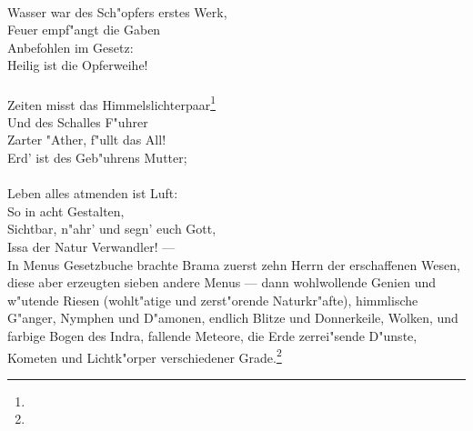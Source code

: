 \documentclass[a4paper, 11pt, oneside, polutonikogreek, german]{article}
\begin{document}
\\
Wasser war des Sch"opfers erstes Werk,\\
Feuer empf"angt die Gaben\\
Anbefohlen im Gesetz:\\
Heilig ist die Opferweihe!\\
\\
\hspace*{1cm} Zeiten misst das Himmelslichterpaar\footnote{}\\
\hspace*{1cm} Und des Schalles F"uhrer\\
\hspace*{1cm} Zarter "Ather, f"ullt das All!\\
\hspace*{1cm} Erd' ist des Geb"uhrens Mutter;\\
\\
\hspace*{2cm} Leben alles atmenden ist Luft:\\
\hspace*{2cm} So in acht Gestalten,\\
\hspace*{2cm} Sichtbar, n"ahr' und segn' euch Gott,\\
\hspace*{2cm} Issa der Natur Verwandler! ---\\

In Menus Gesetzbuche brachte Brama zuerst zehn Herrn der erschaffenen Wesen, diese aber erzeugten sieben andere Menus --- dann wohlwollende Genien und w"utende Riesen (wohlt"atige und zerst"orende Naturkr"afte), himmlische G"anger, Nymphen und D"amonen, endlich Blitze und Donnerkeile, Wolken, und farbige Bogen des Indra, fallende Meteore, die Erde zerrei"sende D"unste, Kometen und Lichtk"orper verschiedener Grade.\footnote{}
\end{document}
